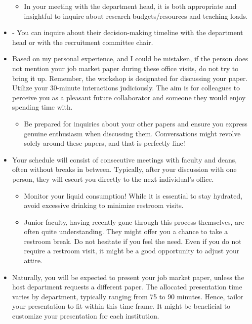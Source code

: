 \documentclass[12pt]{article}
\begin{document}
\begin{itemize}
\begin{itemize}
\item In your meeting with the department head, it is both appropriate and insightful to inquire about research budgets/resources and teaching loads.
\end{itemize}
\item - You can inquire about their decision-making timeline with the department head or with the recruitment committee chair.
\item Based on my personal experience, and I could be mistaken, if the person does not mention your job market paper during these office visits, do not try to bring it up. Remember, the workshop is designated for discussing your paper. Utilize your 30-minute interactions judiciously. The aim is for colleagues to perceive you as a pleasant future collaborator and someone they would enjoy spending time with.
\begin{itemize}
\item Be prepared for inquiries about your other papers and ensure you express genuine enthusiasm when discussing them. Conversations might revolve solely around these papers, and that is perfectly fine!
\end{itemize}
\item Your schedule will consist of consecutive meetings with faculty and deans, often without breaks in between. Typically, after your discussion with one person, they will escort you directly to the next individual's office.
\begin{itemize}
\item Monitor your liquid consumption! While it is essential to stay hydrated, avoid excessive drinking to minimize restroom visits.
\item Junior faculty, having recently gone through this process themselves, are often quite understanding. They might offer you a chance to take a restroom break. Do not hesitate if you feel the need. Even if you do not require a restroom visit, it might be a good opportunity to adjust your attire.
\end{itemize}
\item Naturally, you will be expected to present your job market paper, unless the host department requests a different paper. The allocated presentation time varies by department, typically ranging from 75 to 90 minutes. Hence, tailor your presentation to fit within this time frame. It might be beneficial to customize your presentation for each institution.
\begin{itemize}

\end{itemize}
\end{itemize}
\end{document}
